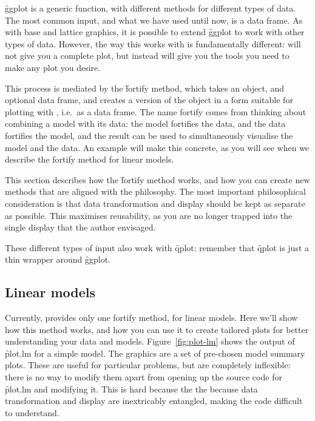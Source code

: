 {\f{ggplot} is a generic function, with different methods for different types of data. The most common input, and what we have used until now, is a data frame. As with base and lattice graphics, it is possible to extend \f{ggplot} to work with other types of data. However, the way this works with \ggplot is fundamentally different: \ggplot will not give you a complete plot, but instead will give you the tools you need to make any plot you desire.

This process is mediated by the \f{fortify} method, which takes an object, and optional data frame, and creates a version of the object in a form suitable for plotting with \ggplot, i.e.\ as a data frame. The name fortify comes from thinking about combining a model with its data: the model fortifies the data, and the data fortifies the model, and the result can be used to simultaneously visualise the model and the data. An example will make this concrete, as you will see when we describe the fortify method for linear models.

This section describes how the \f{fortify} method works, and how you can create new methods that are aligned with the \ggplot philosophy.  The most important philosophical consideration is that data transformation and display should be kept as separate as possible.  This maximises reusability, as you are no longer trapped into the single display that the author envisaged.  

These different types of input also work with \f{qplot}: remember that \f{qplot} is just a thin wrapper around \f{ggplot}.

\subsection{Linear models}

Currently, \ggplot provides only one fortify method, for linear models. Here we'll show how this method works, and how you can use it to create tailored plots for better understanding your data and models. Figure~\ref{fig:plot-lm} shows the output of \f{plot.lm} for a simple model. The graphics are a set of pre-chosen model summary plots. These are useful for particular problems, but are completely inflexible: there is no way to modify them apart from opening up the source code for \f{plot.lm} and modifying it. This is hard because the the because data transformation and display are inextricably entangled, making the code difficult to understand.


}
